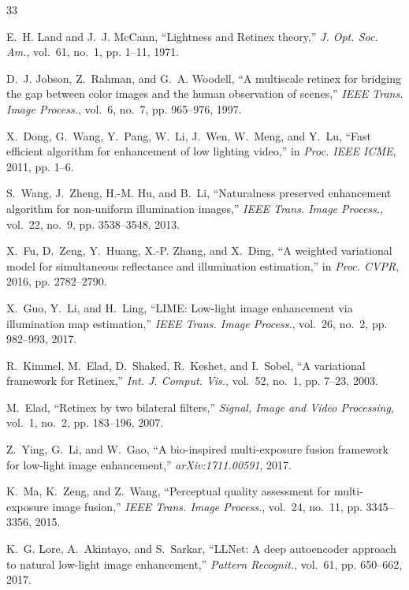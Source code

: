 \documentclass[conference]{IEEEtran}
\begin{document}
\begin{thebibliography}{33}

E.~H. Land and J.~J. McCann, ``Lightness and Retinex theory,'' \emph{J. Opt. Soc. Am.}, vol.~61, no.~1, pp. 1--11, 1971.

D.~J. Jobson, Z.~Rahman, and G.~A. Woodell, ``A multiscale retinex for bridging the gap between color images and the human observation of scenes,'' \emph{IEEE Trans. Image Process.}, vol.~6, no.~7, pp. 965--976, 1997.

X.~Dong, G.~Wang, Y.~Pang, W.~Li, J.~Wen, W.~Meng, and Y.~Lu, ``Fast efficient algorithm for enhancement of low lighting video,'' in \emph{Proc. IEEE ICME}, 2011, pp. 1--6.

S.~Wang, J.~Zheng, H.-M. Hu, and B.~Li, ``Naturalness preserved enhancement algorithm for non-uniform illumination images,'' \emph{IEEE Trans. Image Process.}, vol.~22, no.~9, pp. 3538--3548, 2013.

X.~Fu, D.~Zeng, Y.~Huang, X.-P. Zhang, and X.~Ding, ``A weighted variational model for simultaneous reflectance and illumination estimation,'' in \emph{Proc. CVPR}, 2016, pp. 2782--2790.

X.~Guo, Y.~Li, and H.~Ling, ``LIME: Low-light image enhancement via illumination map estimation,'' \emph{IEEE Trans. Image Process.}, vol.~26, no.~2, pp. 982--993, 2017.

R.~Kimmel, M.~Elad, D.~Shaked, R.~Keshet, and I.~Sobel, ``A variational framework for Retinex,'' \emph{Int. J. Comput. Vis.}, vol.~52, no.~1, pp. 7--23, 2003.

M.~Elad, ``Retinex by two bilateral filters,'' \emph{Signal, Image and Video Processing}, vol.~1, no.~2, pp. 183--196, 2007.

Z.~Ying, G.~Li, and W.~Gao, ``A bio-inspired multi-exposure fusion framework for low-light image enhancement,'' \emph{arXiv:1711.00591}, 2017.

K.~Ma, K.~Zeng, and Z.~Wang, ``Perceptual quality assessment for multi-exposure image fusion,'' \emph{IEEE Trans. Image Process.}, vol.~24, no.~11, pp. 3345--3356, 2015.

K.~G. Lore, A.~Akintayo, and S.~Sarkar, ``LLNet: A deep autoencoder approach to natural low-light image enhancement,'' \emph{Pattern Recognit.}, vol.~61, pp. 650--662, 2017.


\end{thebibliography}
\end{document}
